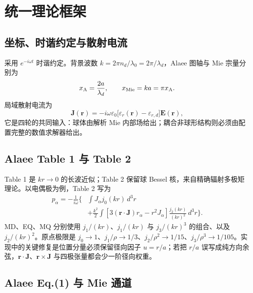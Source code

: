 \section{统一理论框架}

\subsection{坐标、时谐约定与散射电流}

采用 $e^{-i\omega t}$ 时谐约定。背景波数 $k=2\pi n_d/\lambda_0=2\pi/\lambda_d$，Alaee 图轴与 Mie 宗量分别为
\begin{equation}
  x_{\rm A}=\frac{2a}{\lambda_d},\qquad x_{\rm Mie}=ka=\pi x_{\rm A}.
\end{equation}
局域散射电流为
\begin{equation}
  \mathbf J(\mathbf r)=-i\omega\varepsilon_0\bigl[\varepsilon_r(\mathbf r)-\varepsilon_{r,d}\bigr]\mathbf E(\mathbf r),
  \label{eq:current}
\end{equation}
它是四轮的共同输入：球体由解析 Mie 内部场给出；耦合非球形结构则必须由配置完整的数值求解器给出。

\subsection{Alaee Table 1 与 Table 2}

Table 1 是 $kr\to0$ 的长波近似；Table 2 保留球 Bessel 核，来自精确辐射多极矩理论\cite{Alaee2018,FernandezCorbaton2015}。以电偶极为例，Table 2 写为
\begin{equation}
\begin{aligned}
p_\alpha=-\frac{1}{i\omega}\Bigg\{&\int J_\alpha j_0(kr)\,d^3r\\
&+\frac{k^2}{2}\int\left[3(\mathbf r\cdot\mathbf J)r_\alpha-r^2J_\alpha\right]
\frac{j_2(kr)}{(kr)^2}\,d^3r\Bigg\}.
\end{aligned}
\label{eq:exact-ed}
\end{equation}
MD、EQ、MQ 分别使用 $j_1/(kr)$、$j_1/(kr)$ 与 $j_3/(kr)^3$ 的组合、以及 $j_2/(kr)^2$。原点极限是 $j_0\to1$、$j_1/\rho\to1/3$、$j_2/\rho^2\to1/15$、$j_3/\rho^3\to1/105$。实现中的关键修复是位置分量必须保留径向因子 $u=r/a$；若把 $r/a$ 误写成纯方向余弦，$\mathbf r\cdot\mathbf J$、$\mathbf r\times\mathbf J$ 与四极张量都会少一阶径向权重。

\subsection{Alaee Eq.(1) 与 Mie 通道}

